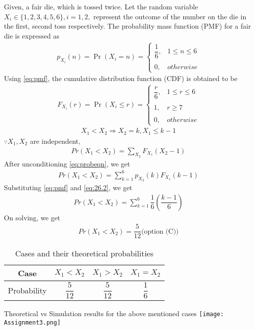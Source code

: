 \documentclass[journal,12pt,twocolumn]{IEEEtran}
\begin{document}
Given, a fair die, which is tossed twice. Let the random variable $X_{i}\in\{1,2,3,4,5,6\},i=1,2,$ represent the outcome of the number on the die in the first, second toss respectively.  
\newline\newline
The probability  mass function (PMF) for a fair die is expressed as \begin{align}
    \tag{26.1}
    \label{eq:pmf}
    p_{X_{i}}(n)=\Pr(X_{i}=n) = 
	\begin{cases}
	\dfrac{1}{6}, & 1\leq n\leq6 \\~\\[-1em]
	0, & otherwise
	\end{cases}
\end{align}
Using \eqref{eq:pmf}, the cumulative distribution function (CDF) is obtained to be
\begin{align}
    \tag{26.2}
    F_{X_{i}}(r)=\Pr(X_{i}\leq r) = 
	\begin{cases}
	\dfrac{r}{6}, & 1\leq r\leq6 \\~\\[-1em]
	1, & r \geq 7 \\~\\[-1em]
	0, & otherwise
	\end{cases}
	\label{eq:26.2}
\end{align}
\begin{align}
    \tag{26.3}
    X_{1}<X_{2}\Rightarrow X_{2}=k,X_{1}\leq k-1
\end{align}
$\because X_{1},X_{2}$ are independent,
\begin{align}
    \tag{26.4}
    Pr(X_{1}<X_{2})=\sum_{X_{2}}F_{X_{1}}(X_{2}-1)
    \label{eq:probeqn}
\end{align}
After unconditioning \eqref{eq:probeqn}, we get
\begin{align}
    \tag{26.5}
    Pr(X_{1}<X_{2})=\sum_{k=1}^{6}p_{X_{2}}(k) F_{X_{1}}(k-1)
\end{align}
Substituting \eqref{eq:pmf} and \eqref{eq:26.2}, we get
\begin{align}
    \tag{26.6}
    Pr(X_{1}<X_{2})=\sum_{k=1}^{6}\dfrac{1}{6}\left(\dfrac{k-1}{6} \right)
\end{align}
On solving, we get
\begin{align}
    \tag{26.7}
    Pr(X_{1}<X_{2})=\dfrac{5}{12}\text{(option (C))}
\end{align}
\begin{table}[h!]
\centering
\caption{Cases and their theoretical probabilities}
\label{table:1}
\begin{tabular}{|c||c|c|c|}
    \hline
    Case & $X_{1}<X_{2}$& $X_{1}>X_{2}$& $X_{1}=X_{2}$ \\
    \hline
    Probability & $\dfrac{5}{12}$ & $\dfrac{5}{12}$ & $\dfrac{1}{6}$\\[1ex]
    \hline
\end{tabular}
\end{table}
\newline
Theoretical vs Simulation results for the above mentioned cases
\centering
\texttt{[image: Assignment3.png]}
\end{document}
